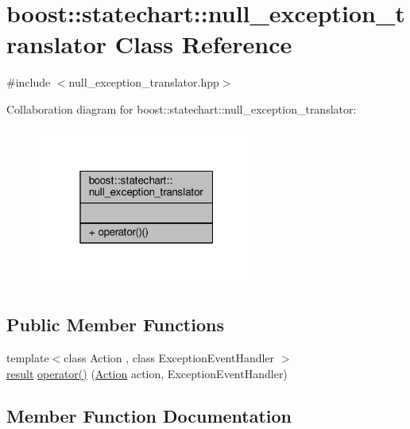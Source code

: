 \hypertarget{classboost_1_1statechart_1_1null__exception__translator}{}\section{boost\+:\+:statechart\+:\+:null\+\_\+exception\+\_\+translator Class Reference}
\label{classboost_1_1statechart_1_1null__exception__translator}


{\ttfamily \#include $<$null\+\_\+exception\+\_\+translator.\+hpp$>$}



Collaboration diagram for boost\+:\+:statechart\+:\+:null\+\_\+exception\+\_\+translator\+:
\nopagebreak
\begin{figure}[H]
\begin{center}
\leavevmode
\includegraphics[width=205pt]{classboost_1_1statechart_1_1null__exception__translator__coll__graph}
\end{center}
\end{figure}
\subsection*{Public Member Functions}
\begin{DoxyCompactItemize}
\item 
{\footnotesize template$<$class Action , class Exception\+Event\+Handler $>$ }\\\mbox{\hyperlink{namespaceboost_1_1statechart_abe807f6598b614d6d87bb951ecd92331}{result}} \mbox{\hyperlink{classboost_1_1statechart_1_1null__exception__translator_a41b11a18f6e665a883e2d11beaca95c0}{operator()}} (\mbox{\hyperlink{_transition_test_8cpp_a0702b01a6272fb248401c96dd3528cec}{Action}} action, Exception\+Event\+Handler)
\end{DoxyCompactItemize}


\subsection{Member Function Documentation}
\mbox{\label{classboost_1_1statechart_1_1null__exception__translator_a41b11a18f6e665a883e2d11beaca95c0}} 
